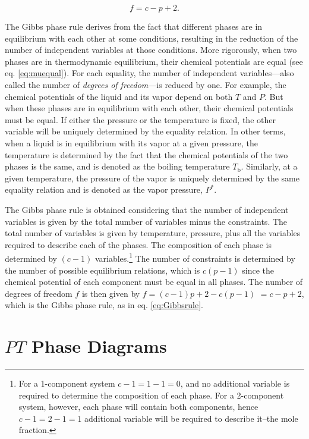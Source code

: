 \documentclass[
  9pt,
]{extbook}
\theoremstyle{definition}
\theoremstyle{definition}
\theoremstyle{definition}
\theoremstyle{definition}
\theoremstyle{remark}
\begin{document}
\begin{equation}
f=c-p+2.
\label{eq:Gibbsrule}
\end{equation}

The Gibbs phase rule derives from the fact that different phases are in equilibrium with each other at some conditions, resulting in the reduction of the number of independent variables at those conditions. More rigorously, when two phases are in thermodynamic equilibrium, their chemical potentials are equal (see eq. \eqref{eq:muequal}). For each equality, the number of independent variables---also called the number of \emph{degrees of freedom}---is reduced by one. For example, the chemical potentials of the liquid and its vapor depend on both \(T\) and \(P\). But when these phases are in equilibrium with each other, their chemical potentials must be equal. If either the pressure or the temperature is fixed, the other variable will be uniquely determined by the equality relation. In other terms, when a liquid is in equilibrium with its vapor at a given pressure, the temperature is determined by the fact that the chemical potentials of the two phases is the same, and is denoted as the boiling temperature \(T_{\text{b}}\). Similarly, at a given temperature, the pressure of the vapor is uniquely determined by the same equality relation and is denoted as the vapor pressure, \(P^*\).

The Gibbs phase rule is obtained considering that the number of independent variables is given by the total number of variables minus the constraints. The total number of variables is given by temperature, pressure, plus all the variables required to describe each of the phases. The composition of each phase is determined by \((c-1)\) variables.\footnote{For a 1-component system \(c-1=1-1=0\), and no additional variable is required to determine the composition of each phase. For a 2-component system, however, each phase will contain both components, hence \(c-1=2-1=1\) additional variable will be required to describe it--the mole fraction.} The number of constraints is determined by the number of possible equilibrium relations, which is \(c(p-1)\) since the chemical potential of each component must be equal in all phases. The number of degrees of freedom \(f\) is then given by \(f=(c-1)p+2-c(p-1)\) \(=c-p+2\), which is the Gibbs phase rule, as in eq. \eqref{eq:Gibbsrule}.

\section{\texorpdfstring{\(PT\) Phase Diagrams}{PT Phase Diagrams}}\label{pt-phase-diagrams}
\end{document}
